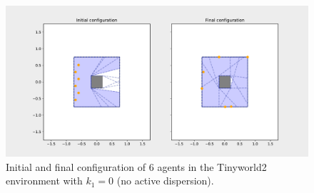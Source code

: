 \begin{figure}[H]
  \centering
  \includegraphics[width=\textwidth]{figs/tinyworld2_6_agnt_k_1_0_k_2_1_distr.pdf}
  \caption{Initial and final configuration of 6 agents in the Tinyworld2 environment with $k_{1} = 0$ (no active dispersion).}
  \label{fig:6_agnt_tw2_k_1_0_distr}
\end{figure}
